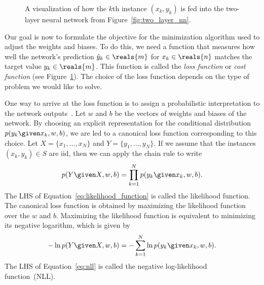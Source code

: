 \documentclass[11pt,a4paper]{article}
\numberwithin{equation}{section}
\begin{document}
\begin{figure}
\caption{A visualization of how the $k$th instance $(x_k, y_k)$ is fed into the
two-layer neural network from
Figure~\ref{fig:two_layer_nn}.\label{fig:nn_with_loss}}
\end{figure}

Our goal is now to formulate the objective for the minimization algorithm used
to adjust the weights and biases. To do this, we need a function that measures
how well the network's prediction $\hat{y}_k \in \reals{m}$ for $x_k \in
\reals{n}$ matches the target value $y_k \in \reals{m}$. This function is called
the \emph{loss function} or \emph{cost function} (see
Figure~\ref{fig:nn_with_loss}). The choice of the loss function depends on the
type of problem we would like to solve.

One way to arrive at the loss function is to assign a probabilistic
interpretation to the network outputs~\citep{ml_bishop}. Let $w$ and $b$ be the
vectors of weights and biases of the network. By choosing an explicit
representation for the conditional distribution $p(y_k \given x_k, w, b)$, we
are led to a canonical loss function corresponding to this choice. Let $X =
\{x_1, \ldots, x_N\}$ and $Y = \{y_1, \ldots, y_N\}$.  If we assume that the
instances $(x_k, y_k) \in S$ are iid, then we can apply the chain rule to write
\[
	p(Y \given X, w, b) = \prod_{k = 1}^N p(y_k \given x_k, w, b).
	\label{eq:likelihood_function}
\]
The LHS of Equation~\ref{eq:likelihood_function} is called the likelihood
function. The canonical loss function is obtained by maximizing the likelihood
function over the $w$ and $b$. Maximizing the likelihood function is equivalent
to minimizing its negative logarithm, which is given by
\begin{equation}
	-\ln{p(Y \given X, w, b)} = -\sum_{k = 1}^N \ln{p(y_k \given x_k, w, b)}.
	\label{eq:nll}
\end{equation}
The LHS of Equation~\ref{eq:nll} is called the negative log-likelihood
function~(NLL).
\end{document}
